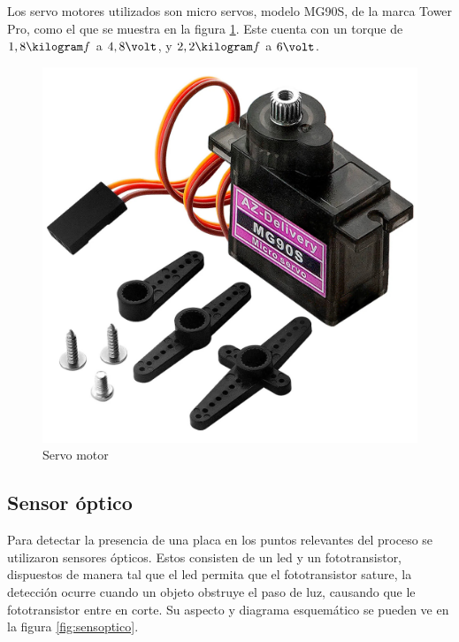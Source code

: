 \documentclass[12pt,letterpaper]{article}     %
\begin{document}
Los servo motores utilizados son micro servos, modelo MG90S, de la marca Tower Pro, como el que
se muestra en la figura \ref{fig:servo}. Este cuenta con un torque de $1,8\kilogram f$ a $4,8\volt$,
y $2,2\kilogram f$ a $6\volt$.

\begin{figure}[!ht]
\centering
\includegraphics[scale=0.15]{imagenes/servo.jpg}
\caption{Servo motor}
\label{fig:servo}
\end{figure}

\subsection{Sensor óptico}

Para detectar la presencia de una placa en los puntos relevantes del proceso se utilizaron sensores ópticos.
Estos consisten de un led y un fototransistor, dispuestos de manera tal que el led permita que el fototransistor
sature, la detección ocurre cuando un objeto obstruye el paso de luz, causando que le fototransistor entre en
corte. Su aspecto y diagrama esquemático se pueden ve en la figura \ref{fig:sensoptico}.
\end{document}
